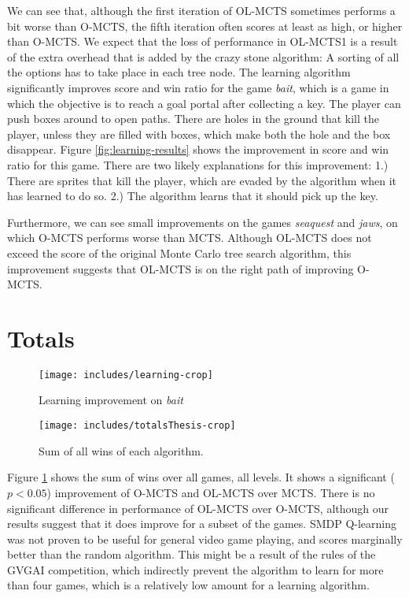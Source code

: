 We can see that, although the first iteration of OL-MCTS sometimes performs a
bit worse than O-MCTS, the fifth iteration often scores at least as high, or
higher than O-MCTS. We expect that the loss of performance in OL-MCTS1 is
a result of the extra overhead that is added by the crazy stone algorithm: A
sorting of all the options has to take place in each tree node. The learning
algorithm significantly improves score and win ratio for the game \textit{bait},
which is a game in which the objective is to reach a goal portal after
collecting a key.  The player can push boxes around to open paths. There are
holes in the ground that kill the player, unless they are filled with boxes,
which make both the hole and the box disappear. Figure
\ref{fig:learning-results} shows the improvement in score and win ratio for this
game. There are two likely explanations for this improvement: 1.) There are
sprites that kill the player, which are evaded by the algorithm when it has
learned to do so.  2.) The algorithm learns that it should pick up the key.

Furthermore, we can see small improvements on the games \textit{seaquest} and
\textit{jaws}, on which O-MCTS performs worse than MCTS.  Although OL-MCTS does
not exceed the score of the original Monte Carlo tree search algorithm, this
improvement suggests that OL-MCTS is on the right path of improving O-MCTS.

\section{Totals}
\label{subsec:totals}

\begin{figure}
	\hfill
	\begin{minipage}{.45\textwidth}
		\begin{center}
			\texttt{[image: includes/learning-crop]}
			\caption{Learning improvement on \textit{bait}}
			\label{fig:learning-results}
		\end{center}
	\end{minipage}
	\hfill
	\begin{minipage}{.45\textwidth}
		\texttt{[image: includes/totalsThesis-crop]}
		\caption{Sum of all wins of each algorithm.}
		\label{fig:total-results}
	\end{minipage}
	\hfill
\end{figure}

Figure \ref{fig:total-results} shows the sum of wins over all games, all levels.
It shows a significant ($p < 0.05$) improvement of O-MCTS and OL-MCTS over MCTS.
There is no significant difference in performance of OL-MCTS over O-MCTS,
although our results suggest that it does improve for a subset of the games.
SMDP Q-learning was not proven to be useful for general video game playing, and
scores marginally better than the random algorithm. This might be a result of
the rules of the GVGAI competition, which indirectly prevent the algorithm to
learn for more than four games, which is a relatively low amount for a learning
algorithm.

